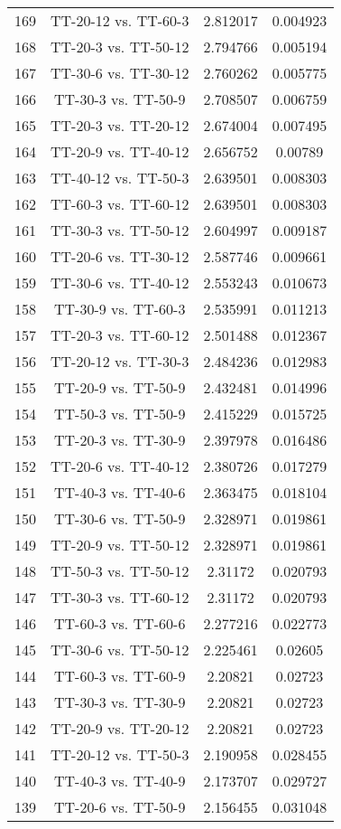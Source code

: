 \documentclass[a4paper,10pt]{article}
\begin{document}
\begin{landscape}
\begin{table}[!htp]
\begin{tabular}{cccc}
169&TT-20-12 vs. TT-60-3&2.812017&0.004923\\
168&TT-20-3 vs. TT-50-12&2.794766&0.005194\\
167&TT-30-6 vs. TT-30-12&2.760262&0.005775\\
166&TT-30-3 vs. TT-50-9&2.708507&0.006759\\
165&TT-20-3 vs. TT-20-12&2.674004&0.007495\\
164&TT-20-9 vs. TT-40-12&2.656752&0.00789\\
163&TT-40-12 vs. TT-50-3&2.639501&0.008303\\
162&TT-60-3 vs. TT-60-12&2.639501&0.008303\\
161&TT-30-3 vs. TT-50-12&2.604997&0.009187\\
160&TT-20-6 vs. TT-30-12&2.587746&0.009661\\
159&TT-30-6 vs. TT-40-12&2.553243&0.010673\\
158&TT-30-9 vs. TT-60-3&2.535991&0.011213\\
157&TT-20-3 vs. TT-60-12&2.501488&0.012367\\
156&TT-20-12 vs. TT-30-3&2.484236&0.012983\\
155&TT-20-9 vs. TT-50-9&2.432481&0.014996\\
154&TT-50-3 vs. TT-50-9&2.415229&0.015725\\
153&TT-20-3 vs. TT-30-9&2.397978&0.016486\\
152&TT-20-6 vs. TT-40-12&2.380726&0.017279\\
151&TT-40-3 vs. TT-40-6&2.363475&0.018104\\
150&TT-30-6 vs. TT-50-9&2.328971&0.019861\\
149&TT-20-9 vs. TT-50-12&2.328971&0.019861\\
148&TT-50-3 vs. TT-50-12&2.31172&0.020793\\
147&TT-30-3 vs. TT-60-12&2.31172&0.020793\\
146&TT-60-3 vs. TT-60-6&2.277216&0.022773\\
145&TT-30-6 vs. TT-50-12&2.225461&0.02605\\
144&TT-60-3 vs. TT-60-9&2.20821&0.02723\\
143&TT-30-3 vs. TT-30-9&2.20821&0.02723\\
142&TT-20-9 vs. TT-20-12&2.20821&0.02723\\
141&TT-20-12 vs. TT-50-3&2.190958&0.028455\\
140&TT-40-3 vs. TT-40-9&2.173707&0.029727\\
139&TT-20-6 vs. TT-50-9&2.156455&0.031048\\

\end{tabular}
\end{table}
\end{landscape}
\end{document}
